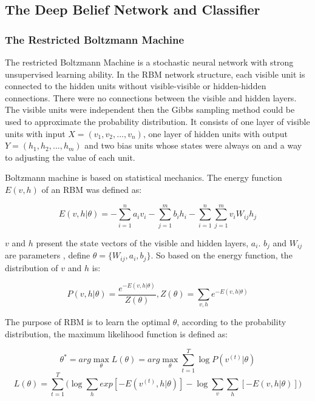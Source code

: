 \documentclass{bmcart}
\begin{document}
\subsection*{The Deep Belief Network and Classifier}

\subsubsection*{The Restricted Boltzmann Machine}
The restricted Boltzmann Machine is a stochastic neural network with strong unsupervised learning ability. In the RBM network structure, each visible unit is connected to the hidden units without visible-visible or hidden-hidden connections. There were no connections between the visible and hidden layers.  The visible units were independent then the Gibbs sampling method could be used to approximate the probability distribution. It consists of one layer of visible units with input $X = (v_1, v_2,...,v_n)$, one layer of hidden units with output $Y=(h_1, h_2,...,h_m)$ and two bias units whose states were always on and a way to adjusting the value of each unit.

Boltzmann machine is based on statistical mechanics. The energy function $E(v, h)$ of an RBM was defined as:

\begin{equation}
E(v,h|\theta) = -\sum_{i=1}^n{a_iv_i}-\sum_{j=1}^m{b_ih_i}-\sum_{i=1}^n\sum_{j=1}^m{v_iW_{ij}h_j}
\end{equation}


$v$ and $h$ present the state vectors of the visible and hidden layers, $a_i$. $b_j$ and $W_{ij}$ are parameters , define $\theta = \{W_{ij}, a_i, b_j\}$. So based on the energy function, the distribution of $v$ and $h$ is:


\begin{equation}
P(v,h|\theta) = \frac{e^{-E(v,h|\theta)}}{Z(\theta)}, Z(\theta) = \sum_{v,h}^{}{e^{-E(v,h|\theta)}}
\end{equation}


The purpose of RBM is to learn the optimal $\theta$, according to the probability distribution, the maximum likelihood function is defined as:

\begin{equation}
\theta^* = arg\max\limits_{\theta}L(\theta) = arg\max\limits_{\theta}\sum_{t=1}^T{\log P(v^{(t)}|\theta)}
\end{equation}
\begin{equation}
L(\theta) = \sum_{t=1}^T\Bigg (\log\sum_{h}^{}{exp[-E(v^{(t)},h|\theta)]}-\log\sum_{v}^{}{\sum_{h}^{}{[-E(v,h|\theta)]}}\Bigg)
\end{equation}
\end{document}
